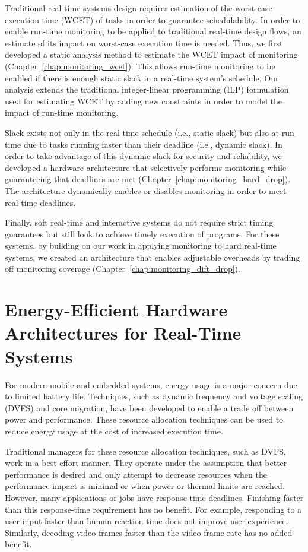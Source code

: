 Traditional real-time systems design requires estimation of the worst-case
execution time (WCET) of tasks in order to guarantee schedulability. In order to
enable run-time monitoring to be applied to traditional real-time design flows,
an estimate of its impact on worst-case execution time is needed. Thus, we
first developed a static analysis method to estimate the WCET impact of monitoring
(Chapter~\ref{chap:monitoring_wcet}). This allows run-time monitoring to be
enabled if there is enough static slack in a real-time system's schedule.
Our analysis extends the traditional integer-linear programming
(ILP) formulation used for estimating WCET by adding new constraints in order
to model the impact of run-time monitoring.

Slack exists not only in the real-time schedule (i.e., static slack) but also
at run-time due to tasks running faster than their deadline (i.e., dynamic
slack). In order to take advantage of this dynamic slack for security and
reliability, we developed a hardware architecture that selectively performs
monitoring while guaranteeing that deadlines are met
(Chapter~\ref{chap:monitoring_hard_drop}). The architecture dynamically enables
or disables monitoring in order to meet real-time deadlines.

Finally, soft real-time and interactive systems do not require strict timing guarantees
but still look to achieve timely execution of programs. For these systems, by building on
our work in applying monitoring to hard real-time systems, we created an
architecture that enables adjustable overheads by trading off monitoring coverage
(Chapter~\ref{chap:monitoring_dift_drop}). 

\section{Energy-Efficient Hardware Architectures for Real-Time Systems}
\label{sec:intro.energy}

For modern mobile and embedded systems, energy usage is a major concern due to
limited battery life. Techniques, such as dynamic frequency and voltage scaling
(DVFS) and core migration, have been developed to enable a trade off
between power and performance. These resource allocation techniques can be used
to reduce energy usage at the cost of increased execution time.

Traditional managers for these resource allocation techniques, such as DVFS,
work in a best effort manner. They operate under the assumption that better
performance is desired and only attempt to decrease resources when the
performance impact is minimal or when power or thermal limits are reached.
However, many applications or jobs have
response-time deadlines. Finishing faster than this response-time
requirement has no benefit. For example, responding to a user input faster than
human reaction time does not improve user experience. Similarly, decoding video
frames faster than the video frame rate has no added benefit. 

